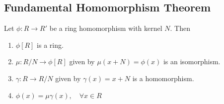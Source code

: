 \documentclass[11pt]{elegantbook}
\begin{document}
\subsection{Fundamental Homomorphism Theorem}
\begin{theorem}
    Let $\phi: R \rightarrow R'$ be a ring homomorphism with kernel $N$. Then
    \begin{enumerate}
        \item $\phi[R]$ is a ring.
        \item $\mu: R/N \rightarrow \phi[R]$ given by $\mu(x+N)=\phi(x)$ is an isomorphism.
        \item $\gamma: R \rightarrow R/N$ given by $\gamma(x)=x+N$ is a homomorphism.
        \item $\phi(x)=\mu\gamma(x),\quad \forall x\in R$
    \end{enumerate}
\end{theorem}
\end{document}
